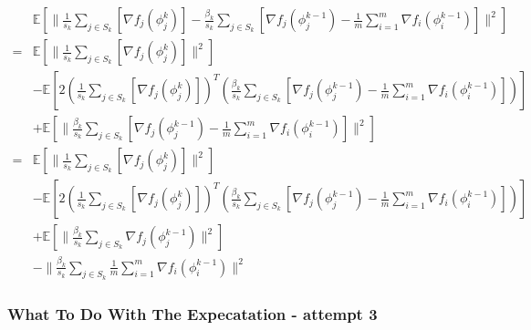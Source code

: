 \documentclass[12pt]{article}
\begin{document}
		\begin{align*}
			& \mathbb{E} \left[  \|\frac{1}{s_k} \sum_{j \in S_k} \left[  \nabla f_j(\phi_j^{k}) \right]- \frac{ \beta_k }{s_k} \sum_{j \in S_k} \left[  \nabla f_j(\phi^{k-1}_j) - \frac{1}{m} \sum_{i = 1}^{m }  \nabla f_i (\phi_i^{k-1}) \right]  \|^2 \right] \\
	=&  \mathbb{E} \left[  \| \frac{1}{s_k} \sum_{j \in S_k} \left[  \nabla f_j(\phi_j^{k}) \right] \|^2  \right] \\
	&-  \mathbb{E} \left[ 2(\frac{1}{s_k} \sum_{j \in S_k} \left[  \nabla f_j(\phi_j^{k}) \right])^T(\frac{ \beta_k }{s_k} \sum_{j \in S_k} \left[  \nabla f_j(\phi^{k-1}_j) - \frac{1}{m} \sum_{i = 1}^{m }  \nabla f_i (\phi_i^{k-1}) \right]  ) \right]\\
	&+  \mathbb{E} \left[ \|\frac{ \beta_k }{s_k} \sum_{j \in S_k} \left[  \nabla f_j(\phi^{k-1}_j) - \frac{1}{m} \sum_{i = 1}^{m }  \nabla f_i (\phi_i^{k-1}) \right]  \|^2 \right] \\
	=&  \mathbb{E} \left[  \| \frac{1}{s_k} \sum_{j \in S_k} \left[  \nabla f_j(\phi_j^{k}) \right] \|^2  \right] \\
	&-  \mathbb{E} \left[ 2(\frac{1}{s_k} \sum_{j \in S_k} \left[  \nabla f_j(\phi_j^{k}) \right])^T(\frac{ \beta_k }{s_k} \sum_{j \in S_k} \left[  \nabla f_j(\phi^{k-1}_j) - \frac{1}{m} \sum_{i = 1}^{m }  \nabla f_i (\phi_i^{k-1}) \right]  ) \right]\\
	&+  \mathbb{E} \left[ \|\frac{ \beta_k }{s_k} \sum_{j \in S_k}  \nabla f_j(\phi^{k-1}_j)  \|^2 \right] \\
	&-  \|\frac{ \beta_k }{s_k} \sum_{j \in S_k} \frac{1}{m} \sum_{i = 1}^{m }  \nabla f_i (\phi_i^{k-1})   \|^2
			\end{align*}
			

				\subsubsection{What To Do With The Expecatation - attempt 3}
\end{document}
